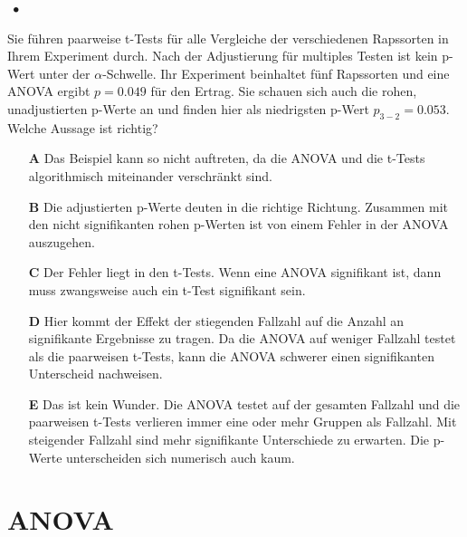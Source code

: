 \documentclass[a4paper, 9pt]{scrartcl}\usepackage[]{graphicx}\usepackage[]{xcolor}
\begin{document}
\ifcollection
\begin{flushright}
\tiny\vspace{-2Ex}
\textbf{\examinhaltstart}
\exammodulestatversuch $\;\bullet$
\exammodulebiostat
\vspace{-1Ex}
\end{flushright}
\fi




Sie führen paarweise t-Tests für alle Vergleiche der verschiedenen Rapssorten in Ihrem Experiment durch. Nach der Adjustierung für multiples Testen ist kein p-Wert unter der $\alpha$-Schwelle. Ihr Experiment beinhaltet fünf Rapssorten und eine ANOVA ergibt $p = 0.049$ für den Ertrag. Sie schauen sich auch die rohen, unadjustierten p-Werte an und finden hier als niedrigsten p-Wert $p_{3-2} = 0.053$. Welche Aussage ist richtig?




\begin{enumerate}
\item [\textbf{A} \msquare] Das Beispiel kann so nicht auftreten, da die ANOVA und die t-Tests algorithmisch miteinander verschränkt sind.
\item [\textbf{B} \msquare] Die adjustierten p-Werte deuten in die richtige Richtung. Zusammen mit den nicht signifikanten rohen p-Werten ist von einem Fehler in der ANOVA auszugehen.
\item [\textbf{C} \msquare] Der Fehler liegt in den t-Tests. Wenn eine ANOVA signifikant ist, dann muss zwangsweise auch ein t-Test signifikant sein.
\item [\textbf{D} \msquare] Hier kommt der Effekt der stiegenden Fallzahl auf die Anzahl an signifikante Ergebnisse zu tragen. Da die ANOVA auf weniger Fallzahl testet als die paarweisen t-Tests, kann die ANOVA schwerer einen signifikanten Unterscheid nachweisen.
\item [\textbf{E} \msquare] Das ist kein Wunder. Die ANOVA testet auf der gesamten Fallzahl und die paarweisen t-Tests verlieren immer eine oder mehr Gruppen als Fallzahl. Mit steigender Fallzahl sind mehr signifikante Unterschiede zu erwarten. Die p-Werte unterscheiden sich numerisch auch kaum.
\end{enumerate}
\section*{ANOVA}
\end{document}
